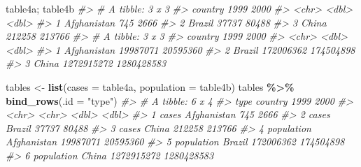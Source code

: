 \documentclass[
  xelatex, ja=standard]{bxjsbook}
\newenvironment{Shaded}{\begin{snugshade}}{\end{snugshade}}
\newcommand{\AttributeTok}[1]{\textcolor[rgb]{0.13,0.29,0.53}{#1}}
\newcommand{\CommentTok}[1]{\textcolor[rgb]{0.56,0.35,0.01}{\textit{#1}}}
\newcommand{\FunctionTok}[1]{\textcolor[rgb]{0.13,0.29,0.53}{\textbf{#1}}}
\newcommand{\NormalTok}[1]{#1}
\newcommand{\OtherTok}[1]{\textcolor[rgb]{0.56,0.35,0.01}{#1}}
\newcommand{\SpecialCharTok}[1]{\textcolor[rgb]{0.81,0.36,0.00}{\textbf{#1}}}
\newcommand{\StringTok}[1]{\textcolor[rgb]{0.31,0.60,0.02}{#1}}
\theoremstyle{definition}
\theoremstyle{definition}
\theoremstyle{definition}
\theoremstyle{definition}
\theoremstyle{remark}
\begin{document}
\begin{Shaded}
\begin{Highlighting}[]
\NormalTok{table4a; table4b}
\CommentTok{\#\textgreater{} \# A tibble: 3 x 3}
\CommentTok{\#\textgreater{}   country     \textasciigrave{}1999\textasciigrave{} \textasciigrave{}2000\textasciigrave{}}
\CommentTok{\#\textgreater{}   \textless{}chr\textgreater{}        \textless{}dbl\textgreater{}  \textless{}dbl\textgreater{}}
\CommentTok{\#\textgreater{} 1 Afghanistan    745   2666}
\CommentTok{\#\textgreater{} 2 Brazil       37737  80488}
\CommentTok{\#\textgreater{} 3 China       212258 213766}
\CommentTok{\#\textgreater{} \# A tibble: 3 x 3}
\CommentTok{\#\textgreater{}   country         \textasciigrave{}1999\textasciigrave{}     \textasciigrave{}2000\textasciigrave{}}
\CommentTok{\#\textgreater{}   \textless{}chr\textgreater{}            \textless{}dbl\textgreater{}      \textless{}dbl\textgreater{}}
\CommentTok{\#\textgreater{} 1 Afghanistan   19987071   20595360}
\CommentTok{\#\textgreater{} 2 Brazil       172006362  174504898}
\CommentTok{\#\textgreater{} 3 China       1272915272 1280428583}
\end{Highlighting}
\end{Shaded}

\begin{Shaded}
\begin{Highlighting}[]
\NormalTok{tables }\OtherTok{\textless{}{-}} \FunctionTok{list}\NormalTok{(}\AttributeTok{cases =}\NormalTok{ table4a, }\AttributeTok{population =}\NormalTok{ table4b)}
\NormalTok{tables }\SpecialCharTok{\%\textgreater{}\%} \FunctionTok{bind\_rows}\NormalTok{(}\AttributeTok{.id =} \StringTok{"type"}\NormalTok{)}
\CommentTok{\#\textgreater{} \# A tibble: 6 x 4}
\CommentTok{\#\textgreater{}   type       country         \textasciigrave{}1999\textasciigrave{}     \textasciigrave{}2000\textasciigrave{}}
\CommentTok{\#\textgreater{}   \textless{}chr\textgreater{}      \textless{}chr\textgreater{}            \textless{}dbl\textgreater{}      \textless{}dbl\textgreater{}}
\CommentTok{\#\textgreater{} 1 cases      Afghanistan        745       2666}
\CommentTok{\#\textgreater{} 2 cases      Brazil           37737      80488}
\CommentTok{\#\textgreater{} 3 cases      China           212258     213766}
\CommentTok{\#\textgreater{} 4 population Afghanistan   19987071   20595360}
\CommentTok{\#\textgreater{} 5 population Brazil       172006362  174504898}
\CommentTok{\#\textgreater{} 6 population China       1272915272 1280428583}
\end{Highlighting}
\end{Shaded}
\end{document}

